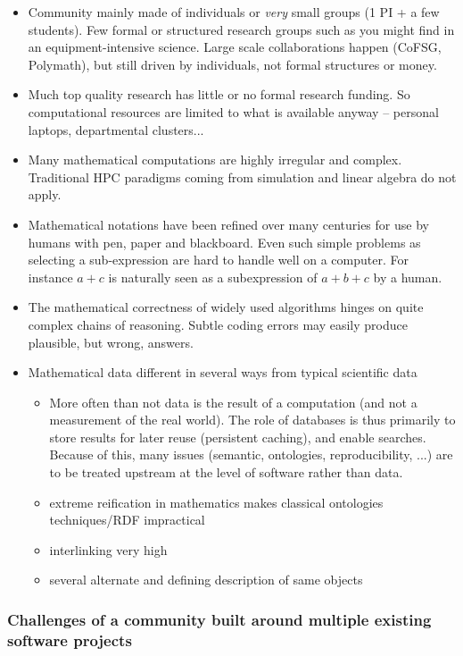\begin{itemize}
\item Community mainly made of individuals or \textit{very} small
  groups (1 PI + a few students). Few formal or structured research
  groups such as you might find in an equipment-intensive
  science. Large scale collaborations happen (CoFSG, Polymath),
  but still driven by individuals, not formal structures or money.
\item Much top quality research has little or no formal research
  funding. So computational resources are limited to what is available
  anyway -- personal laptops, departmental clusters...
\item Many mathematical computations are highly irregular and
  complex. Traditional HPC paradigms coming from simulation and linear
  algebra do not apply.
\item Mathematical notations have been refined over many centuries for
  use by humans with pen, paper and blackboard. Even such simple
  problems as selecting a sub-expression are hard to handle well on a
  computer. For instance $a+c$ is naturally seen as a subexpression of
  $a+b+c$ by a human.
\item The mathematical correctness of widely used algorithms hinges on
  quite complex chains of reasoning. Subtle coding errors may easily
  produce plausible, but wrong, answers.

\item Mathematical data different in several ways from typical
  scientific data
  \begin{itemize}
  \item More often than not data is the result of a computation (and
    not a measurement of the real world). The role of databases is thus primarily
    to store results for later reuse (persistent caching), and enable
    searches. Because of this, many issues (semantic, ontologies,
    reproducibility, ...) are to be treated upstream at the level of
    software rather than data.
  \item extreme reification in mathematics makes classical ontologies
    techniques/RDF impractical 
  \item interlinking very high
  \item several alternate and defining description of same objects
  \end{itemize}
\end{itemize}
\subsubsection{Challenges of a community built around multiple
  existing software projects}

